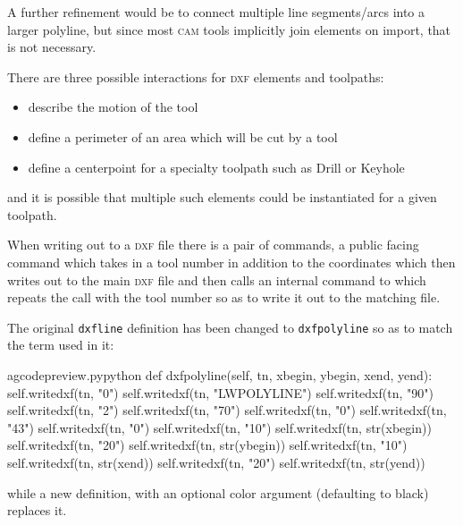 \documentclass{ltxdoc}
\begin{document}
A further refinement would be to connect multiple line segments/arcs into a larger polyline, but since most \textsc{cam} tools implicitly join elements on import, that is not necessary.
 
There are three possible interactions for \textsc{dxf} elements and toolpaths:

\begin{itemize}
 \item describe the motion of the tool
 \item define a perimeter of an area which will be cut by a tool
 \item define a centerpoint for a specialty toolpath such as Drill or Keyhole
\end{itemize}
 
\noindent and it is possible that multiple such elements could be instantiated for a given toolpath.
 
When writing out to a \textsc{dxf} file there is a pair of commands, a public facing command which takes in a tool number in addition to the coordinates which then writes out to the main \textsc{dxf} file and then calls an internal command to which repeats the call with the tool number so as to write it out to the matching file.

The original \verb|dxfline| definition has been changed to \verb|dxfpolyline| so as to match the term used in it:

\lstset{firstnumber=\thegcpy}
\begin{writecode}{a}{gcodepreview.py}{python}
    def dxfpolyline(self, tn, xbegin, ybegin, xend, yend):
        self.writedxf(tn, "0")
        self.writedxf(tn, "LWPOLYLINE")
        self.writedxf(tn, "90")
        self.writedxf(tn, "2")
        self.writedxf(tn, "70")
        self.writedxf(tn, "0")
        self.writedxf(tn, "43")
        self.writedxf(tn, "0")
        self.writedxf(tn, "10")
        self.writedxf(tn, str(xbegin))
        self.writedxf(tn, "20")
        self.writedxf(tn, str(ybegin))
        self.writedxf(tn, "10")
        self.writedxf(tn, str(xend))
        self.writedxf(tn, "20")
        self.writedxf(tn, str(yend))

\end{writecode}
\addtocounter{gcpy}{18}

\noindent while a new definition, with an optional color argument (defaulting to black) replaces it.
\end{document}
